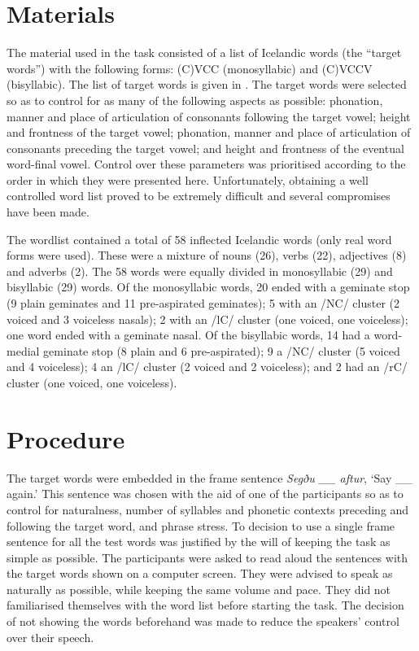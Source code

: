 \documentclass[11pt,a4paper,openany]{memoir}\usepackage[]{graphicx}\usepackage[]{color}
\begin{document}
\section{Materials}
\label{s:materials}
The material used in the task consisted of a list of Icelandic words (the ``target words'') with the following forms: (C)VCC (monosyllabic) and (C)VCCV (bisyllabic).
The list of target words is given in .
The target words were selected so as to control for as many of the following aspects as possible: phonation, manner and place of articulation of consonants following the target vowel; height and frontness of the target vowel; phonation, manner and place of articulation of consonants preceding the target vowel; and height and frontness of the eventual word-final vowel.
Control over these parameters was prioritised according to the order in which they were presented here.
Unfortunately, obtaining a well controlled word list proved to be extremely difficult and several compromises have been made.

The wordlist contained a total of 58 inflected Icelandic words (only real word forms were used).
These were a mixture of nouns (26), verbs (22), adjectives (8) and adverbs (2).
The 58 words were equally divided in monosyllabic (29) and bisyllabic (29) words.
Of the monosyllabic words, 20 ended with a geminate stop (9 plain geminates and 11 pre-aspirated geminates); 5 with an /NC/ cluster (2 voiced and 3 voiceless nasals); 2 with an /lC/ cluster (one voiced, one voiceless); one word ended with a geminate nasal.
Of the bisyllabic words, 14 had a word-medial geminate stop (8 plain and 6 pre-aspirated); 9 a /NC/ cluster (5 voiced and 4 voiceless); 4 an /lC/ cluster (2 voiced and 2 voiceless); and 2 had an /rC/ cluster (one voiced, one voiceless).



\section{Procedure}

The target words were embedded in the frame sentence \textit{Segðu \_\_ aftur}, `Say \_\_ again.'
This sentence was chosen with the aid of one of the participants so as to control for naturalness, number of syllables and phonetic contexts preceding and following the target word, and phrase stress.
To decision to use a single frame sentence for all the test words was justified by the will of keeping the task as simple as possible.
The participants were asked to read aloud the sentences with the target words shown on a computer screen.
They were advised to speak as naturally as possible, while keeping the same volume and pace.
They did not familiarised themselves with the word list before starting the task.
The decision of not showing the words beforehand was made to reduce the speakers' control over their speech.
\end{document}
